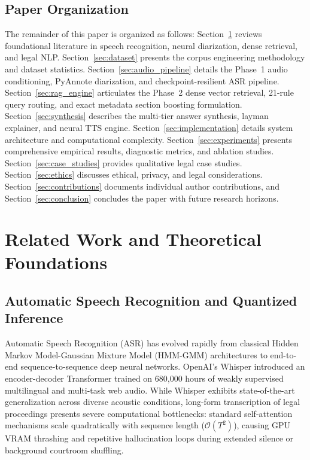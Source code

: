 \documentclass{llncs}
\begin{document}
\subsection{Paper Organization}
The remainder of this paper is organized as follows: Section~\ref{sec:related_work} reviews foundational literature in speech recognition, neural diarization, dense retrieval, and legal NLP. Section~\ref{sec:dataset} presents the corpus engineering methodology and dataset statistics. Section~\ref{sec:audio_pipeline} details the Phase~1 audio conditioning, PyAnnote diarization, and checkpoint-resilient ASR pipeline. Section~\ref{sec:rag_engine} articulates the Phase~2 dense vector retrieval, 21-rule query routing, and exact metadata section boosting formulation. Section~\ref{sec:synthesis} describes the multi-tier answer synthesis, layman explainer, and neural TTS engine. Section~\ref{sec:implementation} details system architecture and computational complexity. Section~\ref{sec:experiments} presents comprehensive empirical results, diagnostic metrics, and ablation studies. Section~\ref{sec:case_studies} provides qualitative legal case studies. Section~\ref{sec:ethics} discusses ethical, privacy, and legal considerations. Section~\ref{sec:contributions} documents individual author contributions, and Section~\ref{sec:conclusion} concludes the paper with future research horizons.


\section{Related Work and Theoretical Foundations}
\label{sec:related_work}

\subsection{Automatic Speech Recognition and Quantized Inference}
Automatic Speech Recognition (ASR) has evolved rapidly from classical Hidden Markov Model-Gaussian Mixture Model (HMM-GMM) architectures to end-to-end sequence-to-sequence deep neural networks. OpenAI's Whisper \cite{radford2023whisper} introduced an encoder-decoder Transformer trained on 680,000 hours of weakly supervised multilingual and multi-task web audio. While Whisper exhibits state-of-the-art generalization across diverse acoustic conditions, long-form transcription of legal proceedings presents severe computational bottlenecks: standard self-attention mechanisms scale quadratically with sequence length ($\mathcal{O}(T^2)$), causing GPU VRAM thrashing and repetitive hallucination loops during extended silence or background courtroom shuffling.
\end{document}
